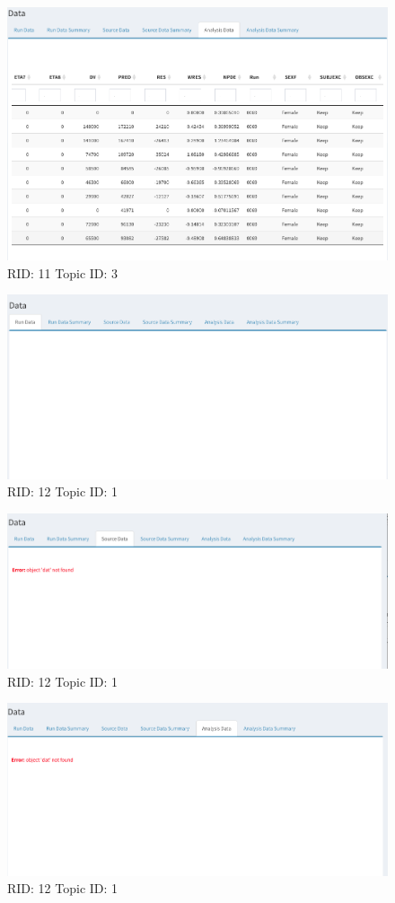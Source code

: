 \documentclass{article}
\begin{document}
\begin{figure}[hp]
\includegraphics[width=.8\textwidth]{screencaps/11-3-1.png}
\caption{RID: 11 Topic ID: 3}
\end{figure}
\newpage
\begin{figure}[hp]
\includegraphics[width=.8\textwidth]{screencaps/12-1-1.png}
\caption{RID: 12 Topic ID: 1}
\end{figure}

\begin{figure}[hp]
\includegraphics[width=.8\textwidth]{screencaps/12-1-2.png}
\caption{RID: 12 Topic ID: 1}
\end{figure}

\begin{figure}[hp]
\includegraphics[width=.8\textwidth]{screencaps/12-1-3.png}
\caption{RID: 12 Topic ID: 1}
\end{figure}
\end{document}
